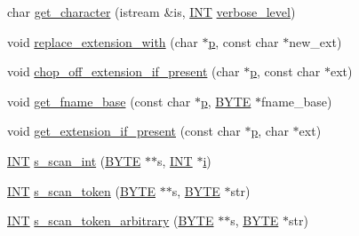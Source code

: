 \begin{DoxyCompactItemize}
char \mbox{\hyperlink{util_8_c_afa11b8d23080c55bbcf00b4ac4fc6045}{get\+\_\+character}} (istream \&is, \mbox{\hyperlink{galois_8h_a09fddde158a3a20bd2dcadb609de11dc}{I\+NT}} \mbox{\hyperlink{simeon_8_c_a818073fbcc2f439e7c56952f67386122}{verbose\+\_\+level}})
\item 
void \mbox{\hyperlink{util_8_c_abd53d5ff0ef75e4cca858aae5d493dba}{replace\+\_\+extension\+\_\+with}} (char $\ast$\mbox{\hyperlink{alphabet2_8_c_a533391314665d6bf1b5575e9a9cd8552}{p}}, const char $\ast$new\+\_\+ext)
\item 
void \mbox{\hyperlink{util_8_c_a9ca43842b56cb96c492a4b2d285a6864}{chop\+\_\+off\+\_\+extension\+\_\+if\+\_\+present}} (char $\ast$\mbox{\hyperlink{alphabet2_8_c_a533391314665d6bf1b5575e9a9cd8552}{p}}, const char $\ast$ext)
\item 
void \mbox{\hyperlink{util_8_c_a9f25fee3f57fa74a30296738b5ebee3d}{get\+\_\+fname\+\_\+base}} (const char $\ast$\mbox{\hyperlink{alphabet2_8_c_a533391314665d6bf1b5575e9a9cd8552}{p}}, \mbox{\hyperlink{galois_8h_ab6cc7b4aeb6ea31aba2b3fbfc83ff5e6}{B\+Y\+TE}} $\ast$fname\+\_\+base)
\item 
void \mbox{\hyperlink{util_8_c_a737197cad3c39e9690cbc9931edcba6b}{get\+\_\+extension\+\_\+if\+\_\+present}} (const char $\ast$\mbox{\hyperlink{alphabet2_8_c_a533391314665d6bf1b5575e9a9cd8552}{p}}, char $\ast$ext)
\item 
\mbox{\hyperlink{galois_8h_a09fddde158a3a20bd2dcadb609de11dc}{I\+NT}} \mbox{\hyperlink{util_8_c_ab43cab8ae063700a2fc82113b69eea5f}{s\+\_\+scan\+\_\+int}} (\mbox{\hyperlink{galois_8h_ab6cc7b4aeb6ea31aba2b3fbfc83ff5e6}{B\+Y\+TE}} $\ast$$\ast$s, \mbox{\hyperlink{galois_8h_a09fddde158a3a20bd2dcadb609de11dc}{I\+NT}} $\ast$\mbox{\hyperlink{alphabet2_8_c_acb559820d9ca11295b4500f179ef6392}{i}})
\item 
\mbox{\hyperlink{galois_8h_a09fddde158a3a20bd2dcadb609de11dc}{I\+NT}} \mbox{\hyperlink{util_8_c_a8d1a4ad92d09138f7a1a7e389469ed45}{s\+\_\+scan\+\_\+token}} (\mbox{\hyperlink{galois_8h_ab6cc7b4aeb6ea31aba2b3fbfc83ff5e6}{B\+Y\+TE}} $\ast$$\ast$s, \mbox{\hyperlink{galois_8h_ab6cc7b4aeb6ea31aba2b3fbfc83ff5e6}{B\+Y\+TE}} $\ast$str)
\item 
\mbox{\hyperlink{galois_8h_a09fddde158a3a20bd2dcadb609de11dc}{I\+NT}} \mbox{\hyperlink{util_8_c_aa2a992efd4d871acb1d802a4e5001d8d}{s\+\_\+scan\+\_\+token\+\_\+arbitrary}} (\mbox{\hyperlink{galois_8h_ab6cc7b4aeb6ea31aba2b3fbfc83ff5e6}{B\+Y\+TE}} $\ast$$\ast$s, \mbox{\hyperlink{galois_8h_ab6cc7b4aeb6ea31aba2b3fbfc83ff5e6}{B\+Y\+TE}} $\ast$str)
\item 
$$
\end{DoxyCompactItemize}
